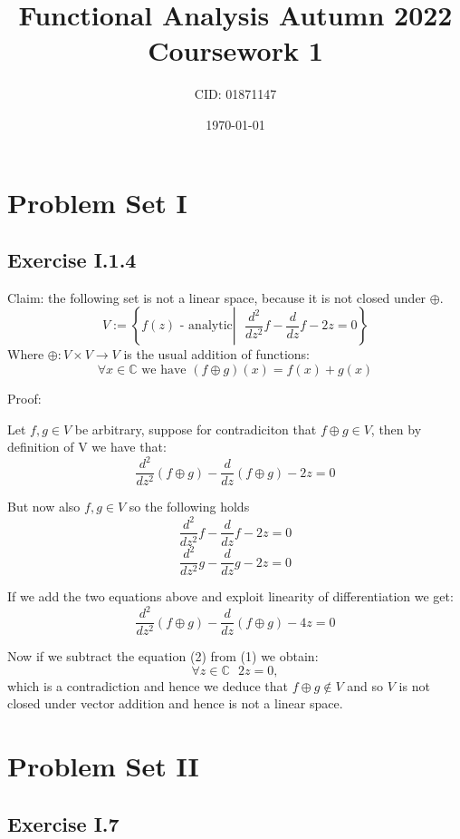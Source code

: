 \documentclass[11pt]{article}
\newcommand\lb{\left\lbrace}
\newcommand\rb{\right\rbrace}
\newcommand\C{\mathbb{C}}
\begin{document}
\title{Functional Analysis Autumn 2022 Coursework 1}
\date{\today}
\author{CID: 01871147}
\maketitle

\section*{Problem Set I}
\subsection*{Exercise I.1.4}

Claim: the following set is not a linear space, because it is not closed under
\( \oplus \).
\[ V := \lb f(z) \text{ - analytic} \left|\text{ } \frac{d^2}{dz^2}f - \frac{d}{dz}f - 2z = 0 \rb\]
Where \(\oplus: V\times V \to V\) is the usual addition of functions:
\[\forall x \in \C \text{ we have } (f \oplus g)(x) = f(x) + g(x)\]

Proof:

Let \(f,g \in V \) be arbitrary, suppose for contradiciton that \(f \oplus g \in V \),
then by definition of V we have that:
\begin{equation}
  \frac{d^2}{dz^2}(f \oplus g) - \frac{d}{dz}(f \oplus g) - 2z = 0
\end{equation}

But now also \(f, g \in V\) so the following holds
\[\frac{d^2}{dz^2}f - \frac{d}{dz}f - 2z = 0\]
\[\frac{d^2}{dz^2}g - \frac{d}{dz}g - 2z = 0\]

If we add the two equations above and exploit linearity of differentiation we get:
\begin{equation}
  \frac{d^2}{dz^2}(f \oplus g) - \frac{d}{dz}(f \oplus g) - 4z = 0
\end{equation}

Now if we subtract the equation (2) from (1) we obtain:
\[\forall z \in \C \text{ }  2z = 0,\]
which is a contradiction and hence we deduce that \(f \oplus g \notin V\) and
so \(V\) is not closed under vector addition and hence is not a linear space.
\hfill\blacksquare

\section*{Problem Set II}
\subsection*{Exercise I.7}
\end{document}
